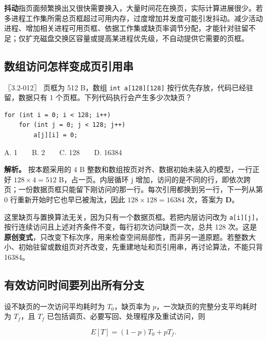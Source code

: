\textbf{抖动}指页面频繁换出又很快需要换入，大量时间花在换页，实际计算进展很少。若多进程工作集所需总页框超过可用内存，过度增加并发度可能引发抖动。减少活动进程、增加相关进程可用页框、依据工作集或缺页率调节分配，才能针对驻留不足；仅扩充磁盘交换区容量或提高某进程优先级，不自动提供它需要的页框。

\subsection{数组访问怎样变成页引用串}\label{os-c05-h238}

\noindent{}〖3.2-012〗 页框为 512 B，数组 \allowbreak{}\texttt{int\ a{[}128{]}{[}128{]}} 按行优先存放，代码已经驻留，数据只有 1 个页框。下列代码执行会产生多少次缺页？

\par\medskip\noindent
\begin{minipage}{\linewidth}
\begin{verbatim}
for (int i = 0; i < 128; i++)
    for (int j = 0; j < 128; j++)
        a[j][i] = 0;
\end{verbatim}
\end{minipage}\par\medskip

A. 1　　B. 2　　C. 128　　D. 16384


\textbf{解析。} 按本题采用的 4 B 整数和数组按页对齐、数据初始未装入的模型，一行正好 \(128\times4=512\) B，占一页。内层循环 j 增加，访问的是不同的行，即依次跨页；一份数据页框只能留下刚访问的那一行。每次引用都换到另一行，下一列从第 0 行重新开始时它也早已被淘汰，因此 \(128\times128=16384\) 次，答案为 \textbf{D}。

这里缺页与置换算法无关，因为只有一个数据页框。若把内层访问改为 \allowbreak{}\texttt{a{[}i{]}{[}j{]}}，按行连续访问且上述对齐条件不变，每行初次访问缺页一次，总共 128 次。这是\textbf{原创变式}，只改变下标次序，用来检查空间局部性，而非另一道原题。若整数大小、初始驻留或数组页对齐改变，先重建地址和页引用串，再讨论算法，不能只背 16384。

\subsection{有效访问时间要列出所有分支}\label{os-c05-h254}

设不缺页的一次访问平均耗时为 \(T_0\)，缺页率为 \(p\)，一次缺页的完整分支平均耗时为 \(T_f\)，且 \(T_f\) 已包括调页、必要写回、处理程序及重试访问，则

\[E[T]=(1-p)T_0+pT_f.\]

